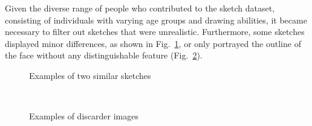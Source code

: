 \noindent Given the diverse range of people who contributed to the sketch dataset, consisting of individuals with varying age groups and drawing abilities, it became necessary to filter out sketches that were unrealistic. Furthermore, some sketches displayed minor differences, as shown in Fig.~\ref{fig:similar sketches}, or only portrayed the outline of the face without any distinguishable feature (Fig.~\ref{fig:discarded images}).
\begin{figure}[htbp]
    \centering
     \quad
    \caption{Examples of two similar sketches}
    \label{fig:similar sketches}
\end{figure}
\begin{figure}[htbp]
    \centering
     \quad
    \\
    \caption{Examples of discarder images}
    \label{fig:discarded images}
\end{figure}

